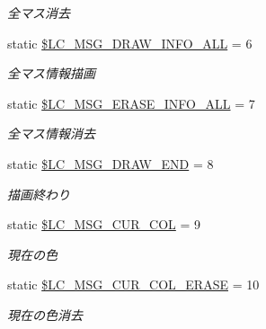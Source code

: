 \begin{DoxyCompactItemize}
\begin{DoxyCompactList}\small\item\em 全マス消去 \end{DoxyCompactList}\item 
\mbox{\label{class_reversi_const_a878b3d361d535e996827103efecdbfa3}} 
static \hyperlink{class_reversi_const_a878b3d361d535e996827103efecdbfa3}{\$\+L\+C\+\_\+\+M\+S\+G\+\_\+\+D\+R\+A\+W\+\_\+\+I\+N\+F\+O\+\_\+\+A\+LL} = 6
\begin{DoxyCompactList}\small\item\em 全マス情報描画 \end{DoxyCompactList}\item 
\mbox{\label{class_reversi_const_ad45d7e4a301c2cfa4b0a12ddfa373425}} 
static \hyperlink{class_reversi_const_ad45d7e4a301c2cfa4b0a12ddfa373425}{\$\+L\+C\+\_\+\+M\+S\+G\+\_\+\+E\+R\+A\+S\+E\+\_\+\+I\+N\+F\+O\+\_\+\+A\+LL} = 7
\begin{DoxyCompactList}\small\item\em 全マス情報消去 \end{DoxyCompactList}\item 
\mbox{\label{class_reversi_const_ac5fc5dc1425fd1c238faf57d0d3d0510}} 
static \hyperlink{class_reversi_const_ac5fc5dc1425fd1c238faf57d0d3d0510}{\$\+L\+C\+\_\+\+M\+S\+G\+\_\+\+D\+R\+A\+W\+\_\+\+E\+ND} = 8
\begin{DoxyCompactList}\small\item\em 描画終わり \end{DoxyCompactList}\item 
\mbox{\label{class_reversi_const_a6acbb83271876a127eadc9eb7cb425cd}} 
static \hyperlink{class_reversi_const_a6acbb83271876a127eadc9eb7cb425cd}{\$\+L\+C\+\_\+\+M\+S\+G\+\_\+\+C\+U\+R\+\_\+\+C\+OL} = 9
\begin{DoxyCompactList}\small\item\em 現在の色 \end{DoxyCompactList}\item 
\mbox{\label{class_reversi_const_aca271c05f15761f26583cfb884e5fc20}} 
static \hyperlink{class_reversi_const_aca271c05f15761f26583cfb884e5fc20}{\$\+L\+C\+\_\+\+M\+S\+G\+\_\+\+C\+U\+R\+\_\+\+C\+O\+L\+\_\+\+E\+R\+A\+SE} = 10
\begin{DoxyCompactList}\small\item\em 現在の色消去 \end{DoxyCompactList}\item 

\end{DoxyCompactItemize}
